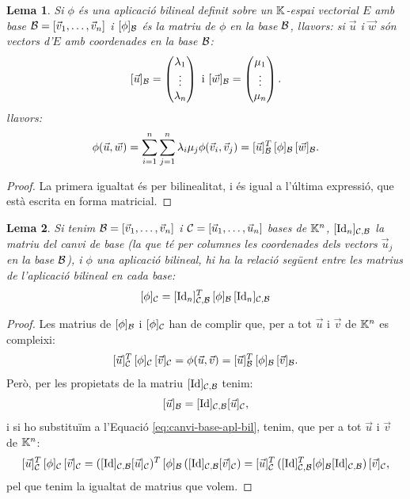 \documentclass[
  11pt,
]{book}
\numberwithin{dummy}{section}
\theoremstyle{maincolornumbox}
\theoremstyle{blacknumex}
\theoremstyle{blacknumbox}
\theoremstyle{maincolornum}
\newtheorem{lemmaT}{Lema}[chapter]
\newenvironment{lemma}{\begin{pBox}\begin{lemmaT}}{\end{lemmaT}\end{pBox}}
\newlength\esp
\begin{document}
\begin{lemma}
Si \(\phi\) és una aplicació bilineal definit sobre un \(\mathbb{K}\)-espai
vectorial \(E\) amb base \(\mathcal{B}=[\vec v_1, \dots, \vec v_n]\) i
\([\phi]_{\mathcal{B}}\) és la matriu de \(\phi\) en la base \(\mathcal{B}\), llavors: si
\(\vec u\) i \(\vec w\) són vectors d'\(E\) amb coordenades en la base
\(\mathcal{B}\): \[[\vec u]_{\mathcal{B}} = \begin{pmatrix}
\lambda_1 \\ \vdots \\ \lambda_n
\end{pmatrix}
\text{ i }
[\vec w]_{\mathcal{B}} = \begin{pmatrix}
\mu_1 \\ \vdots \\ \mu_n
\end{pmatrix}.\] llavors:
\[\phi(\vec u,\vec w)=\sum_{i=1}^n \sum_{j=1}^n \lambda_i\mu_j\phi(\vec v_i,\vec v_j) =[\vec u]_{\mathcal{B}}^T \, [\phi]_{\mathcal{B}} \, [\vec w]_{\mathcal{B}} .\]
\end{lemma}

\begin{proof}
La primera igualtat és per bilinealitat, i és igual a l'última
expressió, que està escrita en forma matricial.
\end{proof}

\begin{lemma}
\protect\hypertarget{lem:canvi-base-forma-bil}{}\label{lem:canvi-base-forma-bil}Si
tenim \(\mathcal{B}=[\vec v_1, \ldots, \vec v_n]\) i
\(\mathcal{C}=[\vec u_1,\ldots, \vec u_n]\) bases de \(\mathbb{K}^n\),
\([\operatorname{Id}_n]_{\mathcal{C},\mathcal{B}}\) la matriu del canvi de base (la que té per
columnes les coordenades dels vectors \(\vec u_j\) en la base \(\mathcal{B}\)), i
\(\phi\) una aplicació bilineal, hi ha la relació següent entre les
matrius de l'aplicació bilineal en cada base:
\[[\phi]_{\mathcal{C}}=[\operatorname{Id}_n]_{\mathcal{C},\mathcal{B}}^T \, [\phi]_{\mathcal{B}} \, [\operatorname{Id}_n]_{\mathcal{C},\mathcal{B}}\]
\end{lemma}

\begin{proof}
Les matrius de \([\phi]_{\mathcal{B}}\) i \([\phi]_{\mathcal{C}}\) han de complir
que, per a tot \(\vec u\) i \(\vec v\) de \(\mathbb{K}^n\) es compleixi:
\begin{align*}
\label{eq:canvi-base-apl-bil}
[\vec u]_{\mathcal{C}}^T \, [\phi]_{\mathcal{C}} \, [\vec v]_{\mathcal{C}} = \phi(\vec u, \vec v)=  [\vec u]_{\mathcal{B}}^T\, [\phi]_{\mathcal{B}}\, [\vec v]_{\mathcal{B}} .
\end{align*} Però, per les propietats de la matriu
\([\operatorname{Id}]_{\mathcal{C},\mathcal{B}}\) tenim:
\[[\vec u]_{\mathcal{B}}=[\operatorname{Id}]_{\mathcal{C},\mathcal{B}} [\vec u]_{\mathcal{C}} ,\] i si ho
substituïm a l'Equació
\eqref{eq:canvi-base-apl-bil}, tenim, que per a tot \(\vec u\) i
\(\vec v\) de \(\mathbb{K}^n\):
\[[\vec u]_{\mathcal{C}}^T \, [\phi]_{\mathcal{C}} \, [\vec v]_{\mathcal{C}} = ([\operatorname{Id}]_{\mathcal{C},\mathcal{B}} [\vec u]_{\mathcal{C}})^T \, [\phi]_{\mathcal{B}} \, ([\operatorname{Id}]_{\mathcal{C},\mathcal{B}} [\vec v]_{\mathcal{C}}) = [\vec u]_{\mathcal{C}}^T \, ([\operatorname{Id}]_{\mathcal{C},\mathcal{B}}^T [\phi]_{\mathcal{B}} [\operatorname{Id}]_{\mathcal{C},\mathcal{B}}) \, [\vec v]_{\mathcal{C}} ,\]
pel que tenim la igualtat de matrius que volem.
\end{proof}
\end{document}

